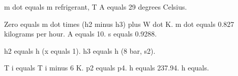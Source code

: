 m dot equals m refrigerant, T A equals 29 degrees Celsius.

Zero equals m dot times (h2 minus h3) plus W dot K. m dot equals 0.827 kilograms per hour. A equals 10. s equals 0.9288.

h2 equals h (x equals 1). h3 equals h (8 bar, s2).

T i equals T i minus 6 K. p2 equals p4. h equals 237.94. h equals.